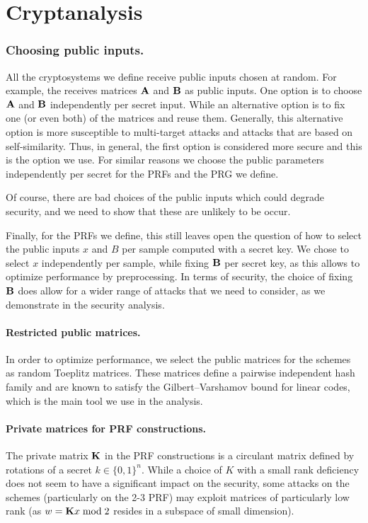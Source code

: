 

\section{Cryptanalysis}
\label{appendix:cryptanalysis}


\subsubsection{Choosing public inputs.}

All the cryptosystems we define receive public inputs chosen at random.
For example, the \ttOWF receives matrices $\mat{A}$ and $\mat{B}$ as public inputs.
One option is to choose $\mat{A}$ and $\mat{B}$ independently per secret input.
While an alternative option is to fix one (or even both) of the matrices and reuse them.
Generally, this alternative option is more susceptible to multi-target
attacks and attacks that are based on self-similarity.
Thus, in general, the first option is considered more secure and this is the option we use.
For similar reasons we choose the public parameters independently per secret for the
PRFs and the PRG we define.

Of course, there are bad choices of the public inputs which could degrade security,
and we need to show that these are unlikely to be occur.

Finally, for the PRFs we define, this still leaves open the question of how to select the public inputs $x$ and $B$
per sample computed with a secret key. We chose to select $x$ independently per sample,
while fixing $\mat{B}$ per secret key, as this allows to optimize performance by preprocessing.
In terms of security, the choice of fixing $\mat{B}$ does allow for a wider range of attacks
that we need to consider, as we demonstrate in the security analysis.

\paragraph{Restricted public matrices.}
In order to optimize performance, we select the public matrices
for the schemes as random Toeplitz matrices. These matrices
define a pairwise independent hash family and are known to satisfy the
Gilbert–Varshamov bound for linear codes, which is the main tool we use in the analysis.

\paragraph{Private matrices for PRF constructions.}
The private matrix $\mat{K}$ in the PRF constructions is a circulant matrix
defined by rotations of a secret $k \in \{0,1\}^n$.
While a choice of $K$ with a small rank deficiency does not seem to
have a significant impact on the security,
some attacks on the schemes (particularly on the 2-3 PRF) may exploit
matrices of particularly low rank
(as $w = \mat{K}x \bmod 2$ resides in a subspace of small dimension).


